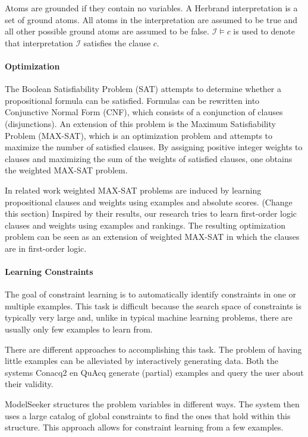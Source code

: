 \documentclass[letterpaper]{article}
\newcommand{\sym}[1]{\ensuremath{\mathcal{#1}}}
\theoremstyle{definition}
\newcommand{\sam}[1]{{\color{red}(#1)}}
\begin{document}
Atoms are grounded if they contain no variables.
A Herbrand interpretation is a set of ground atoms.
All atoms in the interpretation are assumed to be true and all other possible ground atoms are assumed to be false.
$\sym{I} \models c$ is used to denote that interpretation \sym{I} satisfies the clause $c$.

\paragraph{Optimization}
The Boolean Satisfiability Problem (SAT) attempts to determine whether a propositional formula can be satisfied.
Formulas can be rewritten into Conjunctive Normal Form (CNF), which consists of a conjunction of clauses (disjunctions).
An extension of this problem is the Maximum Satisfiability Problem (MAX-SAT), which is an optimization problem and attempts to maximize the number of satisfied clauses.
By assigning positive integer weights to clauses and maximizing the sum of the weights of satisfied clauses, one obtains the weighted MAX-SAT problem.

In related work \cite{campigotto2011active} weighted MAX-SAT problems are induced by learning propositional clauses and weights using examples and absolute scores.
\sam{Change this section}
Inspired by their results, our research tries to learn first-order logic clauses and weights using examples and rankings.
The resulting optimization problem can be seen as an extension of weighted MAX-SAT in which the clauses are in first-order logic.

\paragraph{Learning Constraints}
The goal of constraint learning is to automatically identify constraints in one or multiple examples.
This task is difficult because the search space of constraints is typically very large and, unlike in typical machine learning problems, there are usually only few examples to learn from.

There are different approaches to accomplishing this task.
The problem of having little examples can be alleviated by interactively generating data.
Both the systems Conacq2 \cite{bessiere2007query} en QuAcq \cite{bessiere2013constraint} generate (partial) examples and query the user about their validity.

ModelSeeker \cite{Beldiceanu:ModelSeeker} structures the problem variables in different ways.
The system then uses a large catalog of global constraints to find the ones that hold within this structure. 
This approach allows for constraint learning from a few examples.
\end{document}

